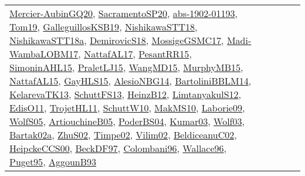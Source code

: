 {\begin{longtable}{lp{3cm}>{\raggedright}p{6cm}>{\raggedright}p{6cm}p{8cm}}
\href{papers/Mercier-AubinGQ20.pdf}{Mercier-AubinGQ20}\cite{Mercier-AubinGQ20}, \href{articles/SacramentoSP20.pdf}{SacramentoSP20}\cite{SacramentoSP20}, \href{articles/abs-1902-01193.pdf}{abs-1902-01193}\cite{abs-1902-01193}, \href{papers/Tom19.pdf}{Tom19}\cite{Tom19}, \href{papers/GalleguillosKSB19.pdf}{GalleguillosKSB19}\cite{GalleguillosKSB19}, \href{papers/NishikawaSTT18.pdf}{NishikawaSTT18}\cite{NishikawaSTT18}, \href{papers/NishikawaSTT18a.pdf}{NishikawaSTT18a}\cite{NishikawaSTT18a}, \href{papers/DemirovicS18.pdf}{DemirovicS18}\cite{DemirovicS18}, \href{papers/MossigeGSMC17.pdf}{MossigeGSMC17}\cite{MossigeGSMC17}, \href{papers/Madi-WambaLOBM17.pdf}{Madi-WambaLOBM17}\cite{Madi-WambaLOBM17}, \href{articles/NattafAL17.pdf}{NattafAL17}\cite{NattafAL17}, \href{papers/PesantRR15.pdf}{PesantRR15}\cite{PesantRR15}, \href{articles/SimoninAHL15.pdf}{SimoninAHL15}\cite{SimoninAHL15}, \href{papers/PraletLJ15.pdf}{PraletLJ15}\cite{PraletLJ15}, \href{articles/WangMD15.pdf}{WangMD15}\cite{WangMD15}, \href{papers/MurphyMB15.pdf}{MurphyMB15}\cite{MurphyMB15}, \href{articles/NattafAL15.pdf}{NattafAL15}\cite{NattafAL15}, \href{papers/GayHLS15.pdf}{GayHLS15}\cite{GayHLS15}, \href{papers/AlesioNBG14.pdf}{AlesioNBG14}\cite{AlesioNBG14}, \href{papers/BartoliniBBLM14.pdf}{BartoliniBBLM14}\cite{BartoliniBBLM14}, \href{papers/KelarevaTK13.pdf}{KelarevaTK13}\cite{KelarevaTK13}, \href{papers/SchuttFS13.pdf}{SchuttFS13}\cite{SchuttFS13}, \href{papers/HeinzB12.pdf}{HeinzB12}\cite{HeinzB12}, \href{articles/LimtanyakulS12.pdf}{LimtanyakulS12}\cite{LimtanyakulS12}, \href{papers/EdisO11.pdf}{EdisO11}\cite{EdisO11}, \href{articles/TrojetHL11.pdf}{TrojetHL11}\cite{TrojetHL11}, \href{papers/SchuttW10.pdf}{SchuttW10}\cite{SchuttW10}, \href{papers/MakMS10.pdf}{MakMS10}\cite{MakMS10}, \href{papers/Laborie09.pdf}{Laborie09}\cite{Laborie09}, \href{papers/WolfS05.pdf}{WolfS05}\cite{WolfS05}, \href{papers/ArtiouchineB05.pdf}{ArtiouchineB05}\cite{ArtiouchineB05}, \href{articles/PoderBS04.pdf}{PoderBS04}\cite{PoderBS04}, \href{papers/Kumar03.pdf}{Kumar03}\cite{Kumar03}, \href{papers/Wolf03.pdf}{Wolf03}\cite{Wolf03}, \href{papers/Bartak02a.pdf}{Bartak02a}\cite{Bartak02a}, \href{papers/ZhuS02.pdf}{ZhuS02}\cite{ZhuS02}, \href{articles/Timpe02.pdf}{Timpe02}\cite{Timpe02}, \href{papers/Vilim02.pdf}{Vilim02}\cite{Vilim02}, \href{papers/BeldiceanuC02.pdf}{BeldiceanuC02}\cite{BeldiceanuC02}, \href{articles/HeipckeCCS00.pdf}{HeipckeCCS00}\cite{HeipckeCCS00}, \href{papers/BeckDF97.pdf}{BeckDF97}\cite{BeckDF97}, \href{papers/Colombani96.pdf}{Colombani96}\cite{Colombani96}, \href{articles/Wallace96.pdf}{Wallace96}\cite{Wallace96}, \href{papers/Puget95.pdf}{Puget95}\cite{Puget95}, \href{articles/AggounB93.pdf}{AggounB93}\cite{AggounB93}\\

\end{longtable}}
